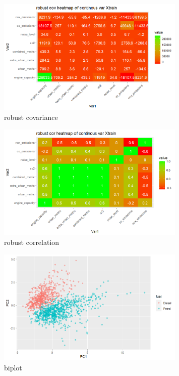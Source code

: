 \documentclass{article}
\begin{document}
\begin{figure}[h!]
        \centering
        \includegraphics[width=0.8\textwidth]{../plots/rob_cov.png}
        \caption{robust covariance}
        \label{fig:robcov}
\end{figure} 

\begin{figure}[h!]
        \centering
        \includegraphics[width=0.8\textwidth]{../plots/rob_cor.png}
        \caption{robust correlation}
        \label{fig:robcor}
\end{figure}


\begin{figure}[h!]
        \centering
        \includegraphics[width=0.8\textwidth]{../plots/pca.png}
        \caption{biplot}
        \label{fig:biplot}
\end{figure}
\end{document}
